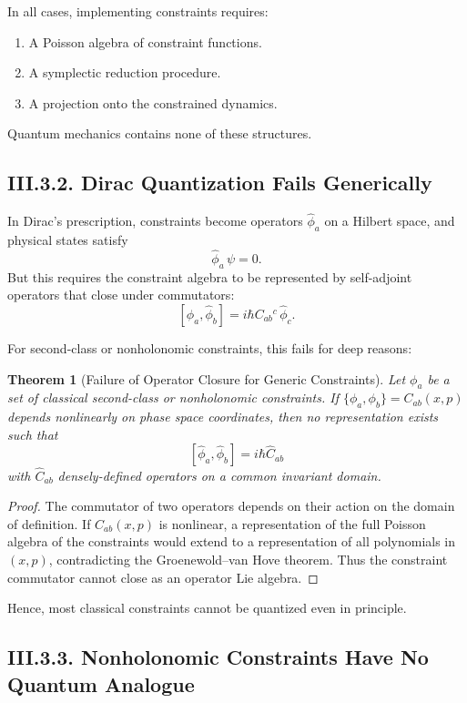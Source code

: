 \documentclass[12pt,oneside]{book}
\theoremstyle{plain}
\newtheorem{theorem}{Theorem}[chapter]
\theoremstyle{definition}
\begin{document}
In all cases, implementing constraints requires:

\begin{enumerate}
    \item A Poisson algebra of constraint functions.
    \item A symplectic reduction procedure.
    \item A projection onto the constrained dynamics.
\end{enumerate}

Quantum mechanics contains none of these structures.

\subsection*{III.3.2. Dirac Quantization Fails Generically}

In Dirac’s prescription, constraints become operators $\widehat{\phi}_a$ on a
Hilbert space, and physical states satisfy
\[
\widehat{\phi}_a \,\psi = 0.
\]
But this requires the constraint algebra to be represented by self-adjoint
operators that close under commutators:
\[
[\widehat{\phi}_a,\widehat{\phi}_b] = i\hbar C_{ab}{}^c\,\widehat{\phi}_c.
\]

For second-class or nonholonomic constraints, this fails for deep reasons:

\begin{theorem}[Failure of Operator Closure for Generic Constraints]
Let $\phi_a$ be a set of classical second-class or nonholonomic constraints.
If $\{\phi_a,\phi_b\}=C_{ab}(x,p)$ depends nonlinearly on phase space
coordinates, then no representation exists such that
\[
[\widehat\phi_a,\widehat\phi_b] = i\hbar\widehat{C}_{ab}
\]
with $\widehat{C}_{ab}$ densely-defined operators on a common invariant
domain.
\end{theorem}

\begin{proof}
The commutator of two operators depends on their action on the domain of
definition. If $C_{ab}(x,p)$ is nonlinear, a representation of the full
Poisson algebra of the constraints would extend to a representation of all
polynomials in $(x,p)$, contradicting the Groenewold–van Hove theorem. Thus
the constraint commutator cannot close as an operator Lie algebra.
\end{proof}

Hence, most classical constraints cannot be quantized even in principle.

\subsection*{III.3.3. Nonholonomic Constraints Have No Quantum Analogue}
\end{document}
